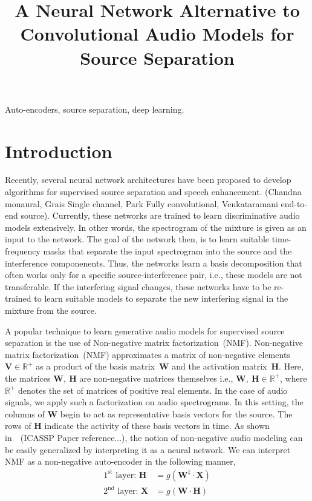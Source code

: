 \documentclass{article}
\title{A Neural Network Alternative to Convolutional Audio Models for Source Separation}
\begin{document}
%

\maketitle
%
\begin{abstract}
\end{abstract}
%
\begin{keywords}
Auto-encoders, source separation, deep learning.
\end{keywords}
%
\section{Introduction}
\label{sec:intro}
Recently, several neural network architectures have been proposed to develop algorithms for supervised source separation and speech enhancement. (Chandna monaural, Grais Single channel, Park Fully convolutional, Venkataramani end-to-end source). Currently, these networks are trained to learn discriminative audio models extensively. In other words, the spectrogram of the mixture is given as an input to the network. The goal of the network then, is to learn suitable time-frequency masks that separate the input spectrogram into the source and the interference componenents. Thus, the networks learn a basis decomposition that often works only for a specific source-interference pair, i.e., these models are not transferable. If the interfering signal changes, these networks have to be re-trained to learn suitable models to separate the new interfering signal in the mixture from the source.  

A popular technique to learn generative audio models for supervised source separation is the use of Non-negative matrix factorization~(NMF). Non-negative matrix factorization~(NMF) approximates a matrix of non-negative elements~$\mathbf{V}\in \mathbb{R^{+}}$ as a product of the basis matrix~$\mathbf{W}$ and the activation matrix~$\mathbf{H}$. Here, the matrices $\mathbf{W},~\mathbf{H}$ are non-negative matrices themselves i.e., $\mathbf{W},~\mathbf{H}\in \mathbb{R^{+}}$, where $\mathbb{R^{+}}$ denotes the set of matrices of positive real elements. In the case of audio signals, we apply such a factorization on audio spectrograms. In this setting, the columns of $\mathbf{W}$ begin to act as representative basis vectors for the source. The rows of $\mathbf{H}$ indicate the activity of these basis vectors in time. 
As shown in~~\cite{}(ICASSP Paper reference...), the notion of non-negative audio modeling can be easily generalized by interpreting it as a neural network. We can interpret NMF as a non-negative auto-encoder in the following manner,
\begin{align}
    \text{$1^{\text{st}}$ layer:~}\mathbf{H} &= g(\mathbf{W^{\ddagger}} \cdot \mathbf{X}) \\
    \text{$2^{\text{nd}}$ layer:~}\mathbf{X} &= g(\mathbf{W} \cdot \mathbf{H})
    \label{eq:nmfae}
\end{align}
\end{document}
